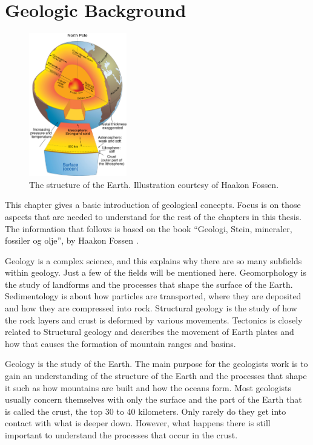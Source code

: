 \documentclass[a4paper,12pt]{report}
\begin{document}
\clearpage


\chapter{Geologic Background}
\label{sec:geology}
\begin{figure}
  \begin{center}
    \includegraphics[width=0.38\textwidth]{thesis/geo/english/indre.jpg}
  \end{center}
  \caption{The structure of the Earth. Illustration courtesy of Haakon Fossen.}
  \label{fig:core}
\end{figure}
This chapter gives a basic introduction of geological concepts. Focus is on those aspects that are needed to understand for the rest of the chapters in this thesis. The information that follows is based on the book ``Geologi, Stein, mineraler, fossiler og olje'', by Haakon Fossen \cite{fossen2008geologi}.

Geology is a complex science, and this explains why there are so many subfields within geology. Just a few of the fields will be mentioned here. Geomorphology is the study of landforms and the processes that shape the surface of the Earth. Sedimentology is about how particles are transported, where they are deposited and how they are compressed into rock. Structural geology is the study of how the rock layers and crust is deformed by various movements. Tectonics is closely related to Structural geology and describes the movement of Earth plates and how that causes the formation of mountain ranges and basins.

Geology is the study of the Earth. The main purpose for the geologists work is to gain an understanding of the structure of the Earth and the processes that shape it such as how mountains are built and how the oceans form. Most geologists usually concern themselves with only the surface and the part of the Earth that is called the crust, the top 30 to 40 kilometers. Only rarely do they get into contact with what is deeper down. However, what happens there is still important to understand the processes that occur in the crust. 
\end{document}
